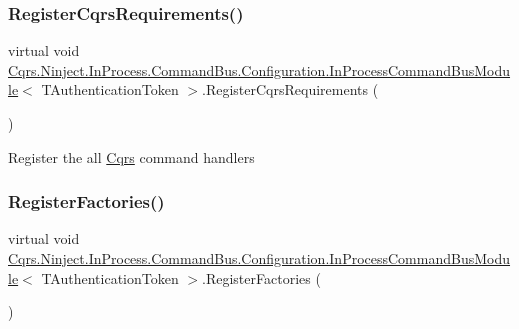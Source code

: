 \subsubsection{\texorpdfstring{Register\+Cqrs\+Requirements()}{RegisterCqrsRequirements()}}
{\footnotesize\ttfamily virtual void \hyperlink{classCqrs_1_1Ninject_1_1InProcess_1_1CommandBus_1_1Configuration_1_1InProcessCommandBusModule}{Cqrs.\+Ninject.\+In\+Process.\+Command\+Bus.\+Configuration.\+In\+Process\+Command\+Bus\+Module}$<$ T\+Authentication\+Token $>$.Register\+Cqrs\+Requirements (\begin{DoxyParamCaption}{ }\end{DoxyParamCaption})\hspace{0.3cm}{\ttfamily [virtual]}}



Register the all \hyperlink{namespaceCqrs}{Cqrs} command handlers 

\mbox{\label{classCqrs_1_1Ninject_1_1InProcess_1_1CommandBus_1_1Configuration_1_1InProcessCommandBusModule_a41d6205a5bc9b85d4dde0798b63bd092}} 
\subsubsection{\texorpdfstring{Register\+Factories()}{RegisterFactories()}}
{\footnotesize\ttfamily virtual void \hyperlink{classCqrs_1_1Ninject_1_1InProcess_1_1CommandBus_1_1Configuration_1_1InProcessCommandBusModule}{Cqrs.\+Ninject.\+In\+Process.\+Command\+Bus.\+Configuration.\+In\+Process\+Command\+Bus\+Module}$<$ T\+Authentication\+Token $>$.Register\+Factories (\begin{DoxyParamCaption}{ }\end{DoxyParamCaption})\hspace{0.3cm}{\ttfamily [virtual]}}



